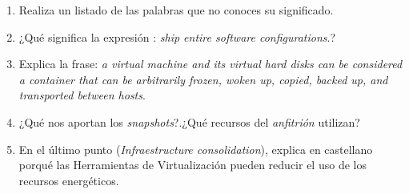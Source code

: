 \documentclass[11pt]{article}
\begin{document}
\begin{enumerate}
\item Realiza un listado de las palabras que no conoces su significado.
\item ¿Qué significa la expresión : \emph{ship entire software configurations}.?
\item Explica la frase: \emph{a virtual machine and its virtual hard disks can be considered a container that can be arbitrarily frozen, woken up, copied, backed up, and transported between hosts}.
\item ¿Qué nos aportan los \emph{snapshots}?.¿Qué recursos del \emph{anfitrión} utilizan?
\item En el último punto (\emph{Infraestructure consolidation}), explica en castellano porqué
las Herramientas de Virtualización pueden reducir el uso de los recursos energéticos.
\end{enumerate}
\end{document}
